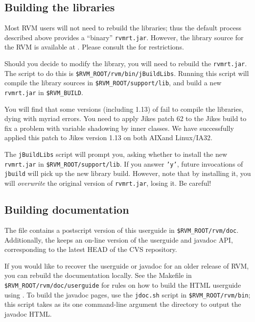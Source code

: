 \JikesTMFooter

\JavaTMFooter

\AIXTMFooter

\subsection{Building the libraries}

Most RVM users will not need to rebuild the libraries; thus the default
process described above provides a ``binary'' {\tt rvmrt.jar}.  However,
the library source for the RVM is available at
\xlink{{\tt \RVMDownloadURL}}{\RVMDownloadURL}.  
Please consult the 
 for restrictions.  

Should you decide to modify the library, you will need to rebuild the 
{\tt rvmrt.jar}.  The script to do this is
{\tt \$RVM\_ROOT/rvm/bin/jBuildLibs}.  Running this script will compile the
library sources in {\tt \$RVM\_ROOT/support/lib}, and build a new {\tt
rvmrt.jar} in {\tt \$RVM\_BUILD}.

You will find that some versions (including 1.13) of 
 fail to compile the
libraries, dying with myriad errors.  You need to apply Jikes 
patch 62 to
the Jikes build to fix a problem with variable shadowing by inner classes. 
We have
successfully applied this patch to Jikes version 1.13 on both
AIX\AIXTMFootnote and Linux/IA32.

The {\tt jBuildLibs} script will prompt you, asking whether to install 
the new {\tt rvmrt.jar} in {\tt \$RVM\_ROOT/support/lib}.  
If you answer {\tt 'y'}, future invocations of {\tt jbuild} will pick up
the new library build.  However, note that by installing it, you will
{\em overwrite} the original version of {\tt rvmrt.jar}, losing it.  Be
careful!

\JikesTMFooter

\AIXTMFooter

\subsection{Building documentation}

The {\tt \RVMTarFile} file contains a postscript version of this userguide
in {\tt \$RVM\_ROOT/rvm/doc}.  Additionally, the 
 keeps an on-line version of
the userguide and javadoc API, corresponding to the latest HEAD of the CVS
repository.

If you would like to recover the userguide or javadoc for an older release
of RVM, you can rebuild the documentation locally.  See the Makefile in
{\tt \$RVM\_ROOT/rvm/doc/userguide} for rules on how to build the
HTML userguide using
.  To build the javadoc pages, use
the {\tt jdoc.sh} script in {\tt \$RVM\_ROOT/rvm/bin}; this script takes as
its one command-line argument the directory to output the javadoc HTML.

